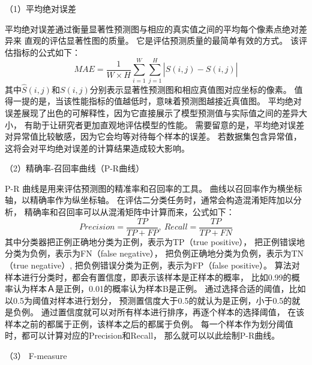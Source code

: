 （1）平均绝对误差\par
平均绝对误差通过衡量显著性预测图与相应的真实值之间的平均每个像素点绝对差异来
直观的评估显著性图的质量。
它是评估预测质量的最简单有效的方式。
该评估指标的公式如下：
\begin{equation}
	MAE=\frac{1}{W \times H}\sum_{i=1}^{W} \sum_{j=1}^{H} \left |  \hat{S} (i,j) - S(i,j)\right | 
\end{equation}
%
%
其中$\hat{S}(i,j)$和$S(i,j)$分别表示显著性预测图和相应真值图对应坐标的像素。
值得一提的是，当该性能指标的值越低时，意味着预测图越接近真值图。
平均绝对误差展现了出色的可解释性，因为它直接展示了模型预测值与实际值之间的差异大小，
有助于让研究者更加直观地评估模型的性能。
需要留意的是，平均绝对误差对异常值比较敏感，因为它会均等对待每个样本的误差。
若数据集包含异常值，这将会对平均绝对误差的计算结果造成较大影响。



（2）精确率-召回率曲线（P-R曲线）\par
%
%
P-R 曲线是用来评估预测图的精准率和召回率的工具。
曲线以召回率作为横坐标轴，以精确率作为纵坐标轴。
在评估二分类任务时，通常会构造混淆矩阵加以分析，
精确率和召回率可以从混淆矩阵中计算而来，公式如下：
%
%
\begin{equation}
	Precision = \frac{TP}{TP + FP},~Recall = \frac{TP}{TP+FN}
\end{equation}
%
%
其中分类器把正例正确地分类为正例，表示为TP（true positive），
把正例错误地分类为负例，表示为FN（false negative），
把负例正确地分类为负例，表示为TN（true negative）,
把负例错误分类为正例，表示为FP（false positive）。
算法对样本进行分类时，都会有置信度，即表示该样本是正样本的概率，
比如0.99的概率认为样本Ａ是正例，0.01的概率认为样本B是正例。
通过选择合适的阈值，比如以0.5为阈值对样本进行划分，
预测置信度大于0.5的就认为是正例，小于0.5的就是负例。
通过置信度就可以对所有样本进行排序，再逐个样本的选择阈值，
在该样本之前的都属于正例，该样本之后的都属于负例。
每一个样本作为划分阈值时，都可以计算对应的Precision和Recall，
那么就可以以此绘制P-R曲线。\par




（3）
F-measure



